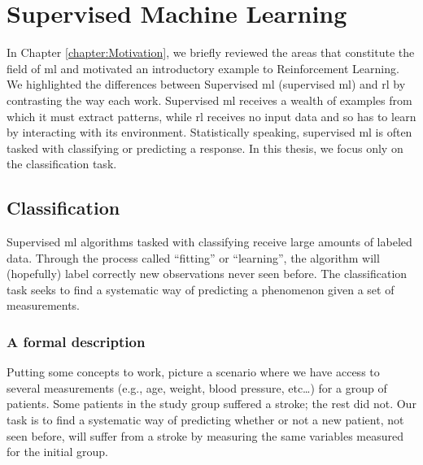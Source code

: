 \chapter{Supervised Machine Learning}
\label{chapter:SupervisedLearning}

In Chapter \ref{chapter:Motivation}, we briefly reviewed the areas that
constitute the field of \ac{ml} and motivated an introductory example to
Reinforcement Learning. We highlighted the differences between Supervised
\ac{ml} (supervised \ac{ml}) and \ac{rl} by contrasting the way each work.
Supervised \ac{ml} receives a wealth of examples from which it must extract
patterns, while \ac{rl} receives no input data and so has to learn by
interacting with its environment. Statistically speaking, supervised \ac{ml} is
often tasked with classifying or predicting a response. In this thesis, we focus
only on the classification task.

\section{Classification}

Supervised \ac{ml} algorithms tasked with classifying receive large amounts of
labeled data. Through the process called ``fitting'' or ``learning'', the
algorithm will (hopefully) label correctly new observations never seen before.
The classification task seeks to find a systematic way of predicting a
phenomenon given a set of measurements.

\subsection{A formal description} \label{sss:formalizing-trees}

Putting some concepts to work, picture a scenario where we have access to
several measurements (e.g., age, weight, blood pressure, etc\dots) for a group
of patients. Some patients in the study group suffered a stroke; the rest did
not. Our task is to find a systematic way of predicting whether or not a new
patient, not seen before, will suffer from a stroke by measuring the same
variables measured for the initial group.

